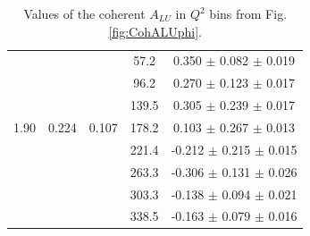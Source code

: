 \documentclass{article}
\begin{document}
\begin{table}[!h]
\begin{center}
\begin{tabular}{|c|c|c|c|c|}
        &       &       &  57.2 &  0.350  $\pm$ 0.082  $\pm$ 0.019  \\ 
        &       &       &  96.2 &  0.270  $\pm$ 0.123  $\pm$ 0.017  \\ 
        &       &       & 139.5 &  0.305  $\pm$ 0.239  $\pm$ 0.017  \\ 
  1.90  & 0.224 & 0.107 & 178.2 &  0.103  $\pm$ 0.267  $\pm$ 0.013  \\ 
        &       &       & 221.4 & -0.212  $\pm$ 0.215  $\pm$ 0.015  \\ 
        &       &       & 263.3 & -0.306  $\pm$ 0.131  $\pm$ 0.026  \\ 
        &       &       & 303.3 & -0.138  $\pm$ 0.094  $\pm$ 0.021  \\ 
        &       &       & 338.5 & -0.163  $\pm$ 0.079  $\pm$ 0.016  \\ 
         \hline 
      \end{tabular}
      \caption{Values of the coherent $A_{LU}$ in $Q^2$ bins from Fig. \ref{fig:CohALUphi}.}
      \label{table:Coh_Q2_BSA}
   \end{center}
\end{table}                    
\end{document}
